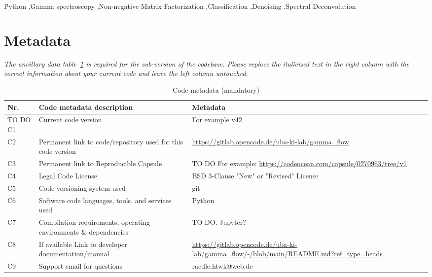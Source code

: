 \documentclass[preprint,12pt, a4paper]{elsarticle}
\begin{document}
\begin{frontmatter}
\begin{keyword}
Python \sep Gamma spectroscopy \sep Non-negative Matrix Factorization \sep Classification \sep Denoising \sep Spectral Deconvolution



\end{keyword}

\end{frontmatter}


\section*{Metadata}
\label{}
\textit{The ancillary data table~\ref{codeMetadata} is required for the sub-version of the codebase. Please replace the italicized text in the right column with the correct information about your current code and leave the left column untouched.}

\begin{table}[!h]
\begin{tabular}{|l|p{6.5cm}|p{6.5cm}|}
\hline
\textbf{Nr.} & \textbf{Code metadata description} & \textbf{Metadata} \\
\hline
TO DO C1 & Current code version & For example v42 \\
\hline
C2 & Permanent link to code/repository used for this code version & \url{https://gitlab.opencode.de/uba-ki-lab/gamma_flow} \\
\hline
C3  & Permanent link to Reproducible Capsule & TO DO For example: \url{https://codeocean.com/capsule/0270963/tree/v1}\\
\hline
C4 & Legal Code License   & BSD 3-Clause "New" or "Revised" License \\
\hline
C5 & Code versioning system used & git\\
\hline
C6 & Software code languages, tools, and services used & Python \\
\hline
C7 & Compilation requirements, operating environments \& dependencies & TO DO. Jupyter?  \\
\hline
C8 & If available Link to developer documentation/manual & \url{https://gitlab.opencode.de/uba-ki-lab/gamma_flow/-/blob/main/README.md?ref_type=heads} \\
\hline
C9 & Support email for questions & raedle.htwk@web.de\\
\hline
\end{tabular}
\caption{Code metadata (mandatory)}
\label{codeMetadata} 
\end{table}
\end{document}
